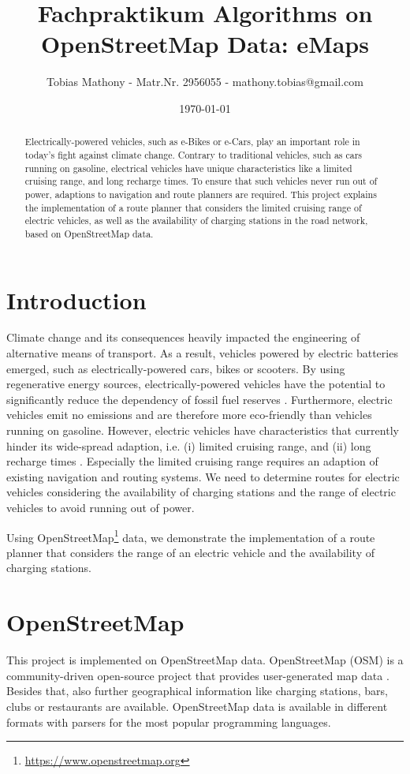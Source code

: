 \documentclass[a4paper]{article}
\author{Tobias Mathony - Matr.Nr. 2956055 - mathony.tobias@gmail.com}
\title{Fachpraktikum Algorithms on OpenStreetMap Data: eMaps}
\date{\today}
\begin{document}
\maketitle
\begin{abstract}
Electrically-powered vehicles, such as e-Bikes or e-Cars, play an important role in today's fight against climate change.
Contrary to traditional vehicles, such as cars running on gasoline, electrical vehicles have unique characteristics like a limited cruising range, and long recharge times.
To ensure that such vehicles never run out of power, adaptions to navigation and route planners are required.
This project explains the implementation of a route planner that considers the limited cruising range of electric vehicles, as well as the availability of charging stations in the road network, based on OpenStreetMap data. 
\end{abstract}
\section{Introduction}
Climate change and its consequences heavily impacted the engineering of alternative means of transport.
As a result, vehicles powered by electric batteries emerged, such as electrically-powered cars, bikes or scooters.
By using regenerative energy sources, electrically-powered vehicles have the potential to significantly reduce the dependency of fossil fuel reserves \cite{Artmeier2010}.
Furthermore, electric vehicles emit no emissions and are therefore more eco-friendly than vehicles running on gasoline.
However, electric vehicles have characteristics that currently hinder its wide-spread adaption, i.e. (i) limited cruising range, and (ii) long recharge times \cite{Artmeier2010}.
Especially the limited cruising range requires an adaption of existing navigation and routing systems.
We need to determine routes for electric vehicles considering the availability of charging stations and the range of electric vehicles to avoid running out of power.\par\medskip
Using OpenStreetMap\footnote{\url{https://www.openstreetmap.org}} data, we demonstrate the implementation of a route planner that considers the range of an electric vehicle and the availability of charging stations. 
\section{OpenStreetMap}
This project is implemented on OpenStreetMap data.
OpenStreetMap (OSM) is a community-driven open-source project that provides user-generated map data \cite{Haklay2008}.
Besides that, also further geographical information like charging stations, bars, clubs or restaurants are available.
OpenStreetMap data is available in different formats with parsers for the most popular programming languages.\par\medskip
\end{document}

